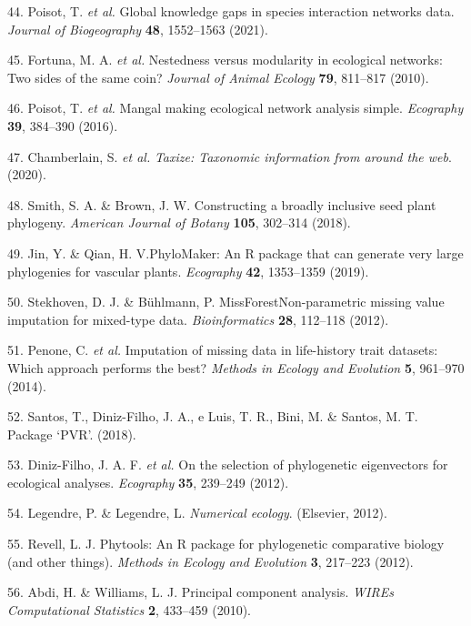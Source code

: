 \documentclass[12pt,a4paper,]{article}
\begin{document}
\hypertarget{ref-poisot2021}{}
44. Poisot, T. \emph{et al.} Global knowledge gaps in species
interaction networks data. \emph{Journal of Biogeography} \textbf{48},
1552--1563 (2021).

\hypertarget{ref-fortuna2010}{}
45. Fortuna, M. A. \emph{et al.} Nestedness versus modularity in
ecological networks: Two sides of the same coin? \emph{Journal of Animal
Ecology} \textbf{79}, 811--817 (2010).

\hypertarget{ref-poisot2016}{}
46. Poisot, T. \emph{et al.} Mangal making ecological network analysis
simple. \emph{Ecography} \textbf{39}, 384--390 (2016).

\hypertarget{ref-chamberlain2020}{}
47. Chamberlain, S. \emph{et al.} \emph{Taxize: Taxonomic information
from around the web}. (2020).

\hypertarget{ref-smith2018}{}
48. Smith, S. A. \& Brown, J. W. Constructing a broadly inclusive seed
plant phylogeny. \emph{American Journal of Botany} \textbf{105},
302--314 (2018).

\hypertarget{ref-jin2019}{}
49. Jin, Y. \& Qian, H. V.PhyloMaker: An R package that can generate
very large phylogenies for vascular plants. \emph{Ecography}
\textbf{42}, 1353--1359 (2019).

\hypertarget{ref-stekhoven2012}{}
50. Stekhoven, D. J. \& Bühlmann, P. MissForestNon-parametric missing
value imputation for mixed-type data. \emph{Bioinformatics} \textbf{28},
112--118 (2012).

\hypertarget{ref-penone2014}{}
51. Penone, C. \emph{et al.} Imputation of missing data in life-history
trait datasets: Which approach performs the best? \emph{Methods in
Ecology and Evolution} \textbf{5}, 961--970 (2014).

\hypertarget{ref-santos2018}{}
52. Santos, T., Diniz-Filho, J. A., e Luis, T. R., Bini, M. \& Santos,
M. T. Package `PVR'. (2018).

\hypertarget{ref-diniz-filho2012}{}
53. Diniz-Filho, J. A. F. \emph{et al.} On the selection of phylogenetic
eigenvectors for ecological analyses. \emph{Ecography} \textbf{35},
239--249 (2012).

\hypertarget{ref-legendre2012}{}
54. Legendre, P. \& Legendre, L. \emph{Numerical ecology}. (Elsevier,
2012).

\hypertarget{ref-revell2012}{}
55. Revell, L. J. Phytools: An R package for phylogenetic comparative
biology (and other things). \emph{Methods in Ecology and Evolution}
\textbf{3}, 217--223 (2012).

\hypertarget{ref-abdi2010}{}
56. Abdi, H. \& Williams, L. J. Principal component analysis.
\emph{WIREs Computational Statistics} \textbf{2}, 433--459 (2010).
\end{document}
